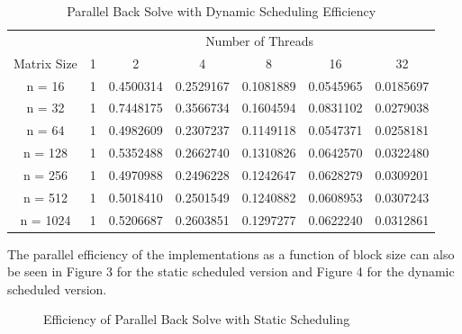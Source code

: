 \documentclass{article}
\begin{document}
\begin{table}[ht!]
    \caption{Parallel Back Solve with Dynamic Scheduling Efficiency}
    \centering
    \begin{tabular}{|c|c|c|c|c|c|c|}
        \hline
        \multicolumn{1}{|c|}{} & \multicolumn{6}{c|}{Number of Threads} \\
        \cline{2-7}
        \multicolumn{1}{|c|}{Matrix Size} & 1 & 2 & 4 & 8 & 16 & 32 \\
        \hline
        n = 16 & 1 & 0.4500314 & 0.2529167 & 0.1081889 & 0.0545965 & 0.0185697 \\
        \hline
        n = 32 & 1 & 0.7448175 & 0.3566734 & 0.1604594 & 0.0831102 & 0.0279038 \\
        \hline
        n = 64 & 1 & 0.4982609 & 0.2307237 & 0.1149118 & 0.0547371 & 0.0258181 \\
        \hline
        n = 128 & 1 & 0.5352488 & 0.2662740 & 0.1310826 & 0.0642570 & 0.0322480 \\
        \hline
        n = 256 & 1 & 0.4970988 & 0.2496228 & 0.1242647 & 0.0628279 & 0.0309201 \\
        \hline
        n = 512 & 1 & 0.5018410 & 0.2501549 & 0.1240882 & 0.0608953 & 0.0307243 \\
        \hline
        n = 1024 & 1 & 0.5206687 & 0.2603851 & 0.1297277 & 0.0622240 & 0.0312861 \\
        \hline
    \end{tabular}
\end{table}

\bigskip
\noindent
The parallel efficiency of the implementations as a function of block size can also be seen in Figure 3 for the static scheduled version and Figure 4 for the dynamic scheduled version.

\clearpage

\begin{figure}[htb!]
    \centering
    \caption{Efficiency of Parallel Back Solve with Static Scheduling}
\end{figure}
\end{document}
